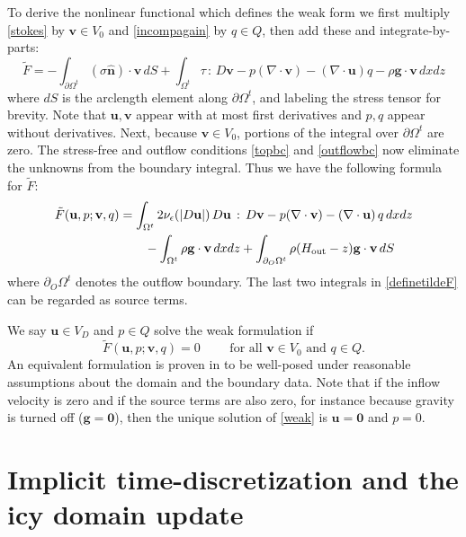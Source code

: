 \documentclass[letterpaper,final,12pt,reqno]{amsart}
\newcommand{\eps}{\epsilon}
\newcommand{\hbn}{\hat{\mathbf{n}}}
\newcommand{\bg}{\mathbf{g}}
\newcommand{\bu}{\mathbf{u}}
\newcommand{\bv}{\mathbf{v}}
\newcommand{\bzero}{\bm{0}}
\begin{document}
To derive the nonlinear functional which defines the weak form we first multiply \eqref{stokes} by $\bv\in V_0$ and \eqref{incompagain} by $q\in Q$, then add these and integrate-by-parts:
\begin{equation}
\tilde F = -\int_{\partial\Omega^t} (\sigma \hbn)\cdot \bv\,dS + \int_{\Omega^t} \tau \,:\,D\bv - p (\nabla \cdot \bv) - \left(\nabla \cdot \bu\right) q - \rho \mathbf{g} \cdot \bv \,dx dz \label{nonfunctwo}
\end{equation}
where $dS$ is the arclength element along $\partial\Omega^t$, and labeling the stress tensor for brevity.  Note that $\bu,\bv$ appear with at most first derivatives and $p,q$ appear without derivatives.  Next, because $\bv\in V_0$, portions of the integral over $\partial\Omega^t$ are zero.  The stress-free and outflow conditions \eqref{topbc} and \eqref{outflowbc} now eliminate the unknowns from the boundary integral.  Thus we have the following formula for $\tilde F$:
\begin{align}
\tilde F(\bu,p;\bv,q) &= \int_{\Omega^t} 2 \nu_\eps(|D\bu|)\, D\bu\,:\,D\bv - p (\nabla \cdot \bv) - \left(\nabla \cdot \bu\right) q \,dx dz \label{definetildeF} \\
    &\qquad  - \int_{\Omega^t} \rho \mathbf{g} \cdot \bv \,dx dz + \int_{\partial_O \Omega^t} \rho (H_{\text{out}}-z) \bg \cdot \bv \,dS \notag
\end{align}
where $\partial_O \Omega^t$ denotes the outflow boundary.  The last two integrals in \eqref{definetildeF} can be regarded as source terms.

We say $\bu\in V_D$ and $p\in Q$ solve the weak formulation if
\begin{equation}
\tilde F(\bu,p;\bv,q) = 0 \qquad \text{ for all } \bv\in V_0 \text{ and } q\in Q.  \label{weak}
\end{equation}
An equivalent formulation is proven in \cite[Theorem 3.8]{JouvetRappaz2011} to be well-posed under reasonable assumptions about the domain and the boundary data.  Note that if the inflow velocity is zero and if the source terms are also zero, for instance because gravity is turned off ($\bg=\bzero$), then the unique solution of \eqref{weak} is $\bu=\bzero$ and $p=0$.


\section{Implicit time-discretization and the icy domain update} \label{sec:implicitstep}
\end{document}

